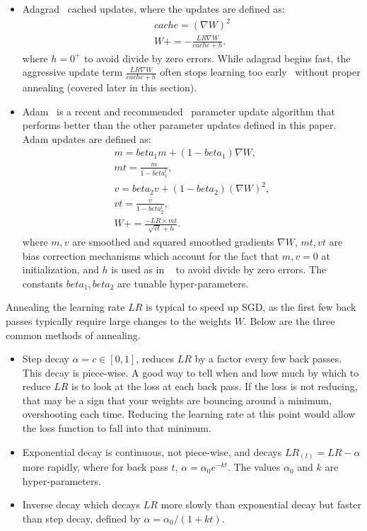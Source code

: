 \begin{itemize}
\item Adagrad~\cite{adagrad} cached updates, where the updates are defined as:
\begin{subequations}
\label{eq:adagrad}
\begin{align}
cache = (\nabla W)^2
\\
W += -\frac{LR \nabla W}{cache + h}.
\end{align}
\end{subequations}
where $h = 0^+$ to avoid divide by zero errors. While adagrad begins fast, the aggressive update term $\frac{LR \nabla W}{cache + h}$ often stops learning too early~\cite{cs231} without proper annealing (covered later in this section).

\item Adam~\cite{adam} is a recent and recommended~\cite{cs231} parameter update algorithm that performs better than the other parameter updates defined in this paper. Adam updates are defined as:
\begin{subequations}
\label{eq:adam}
\begin{align}
m = beta_1m + (1-beta_1)\nabla W,
\\
mt = \frac{m}{1-beta_1^t},
\\
v = beta_2v + (1-beta_2)(\nabla W)^2,
\\
vt = \frac{v}{1-beta_2^t},
\\
W += \frac{-LR \times mt}{\sqrt{vt} + h}.
\end{align}
\end{subequations}
where $m,v$ are smoothed and squared smoothed gradients $\nabla W$, $mt,vt$ are bias correction mechanisms which account for the fact that $m, v = 0$ at initialization, and $h$ is used as in ~\cite{adagrad} to avoid divide by zero errors. The constants $beta_1, beta_2$ are tunable hyper-parameters.
\end{itemize}

Annealing the learning rate $LR$ is typical to speed up SGD, as the first few back passes typically require large changes to the weights $W$. Below are the three common methods of annealing.
\begin{itemize}
\item Step decay $\alpha = c \in [ 0,1 ]$, reduces $LR$ by a factor every few back passes. This decay is piece-wise. A good way to tell when and how much by which to reduce $LR$ is to look at the loss at each back pass. If the loss is not reducing, that may be a sign that your weights are bouncing around a minimum, overshooting each time. Reducing the learning rate at this point would allow the loss function to fall into that minimum.
\item Exponential decay is continuous, not piece-wise, and decays $LR_{(t)} = LR - \alpha$ more rapidly, where for back pass $t$, $\alpha = \alpha_0 e^{-k t}$. The values $\alpha_0$ and $k$ are hyper-parameters.
\item Inverse decay which decays $LR$ more slowly than exponential decay but faster than step decay, defined by $\alpha = \alpha_0 / (1 + k t )$.
\end{itemize}

